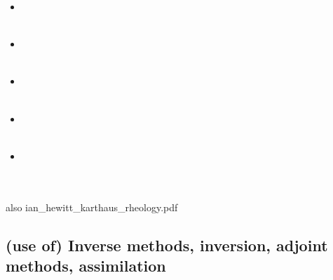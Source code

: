 \begin{scriptsize}
\begin{itemize}
\textcite{moad14} \cite{moad14}\\
\item[\twothousandfifteen] 
\textcite{issg15} \cite{issg15}\\
\textcite{frlg15} \cite{frlg15}\\
\item[\twothousandsixteen] 
\textcite{krab16} \cite{krab16}\\
\textcite{daws16} \cite{daws16}\\
\item[\twothousandseventeen] 
\textcite{lolc17} \cite{lolc17}\\
\textcite{gors17} \cite{gors17}\\
\item[\twothousandeighteen] 
\textcite{heah18} \cite{heah18}\\
\textcite{mimr18} \cite{mimr18}\\
\item[\twothousandnineteen] 
\textcite{kudd19} \cite{kudd19}\\
\textcite{kuwd19} \cite{kuwd19}\\
\textcite{kuiper19} \cite{kuiper19}\\
\end{itemize}
\end{scriptsize}


also ian\_hewitt\_karthaus\_rheology.pdf

\subsection{(use of) Inverse methods, inversion, adjoint methods, assimilation}


